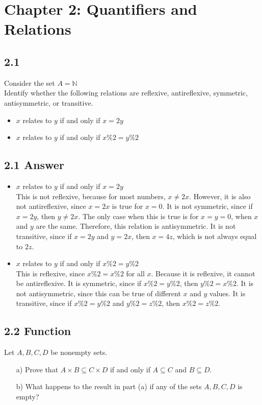 \documentclass{article}
\begin{document}
\section*{Chapter 2: Quantifiers and Relations}
\subsection*{2.1}
Consider the set $A=\mathbb{N}$
\\ Identify whether the following relations are reflexive, antireflexive, symmetric, antisymmetric, or transitive.
\begin{itemize}
    \item $x$ relates to $y$ if and only if $x=2y$ 
    \item $x$ relates to $y$ if and only if $x\%2=y\%2$
\end{itemize}
\newpage
\subsection*{2.1 Answer}
\begin{itemize}
    \item $x$ relates to $y$ if and only if $x=2y$
    \\ This is not reflexive, because for most numbers, $x\neq 2x$. However, it is also not antireflexive, since $x=2x$ is true for $x=0$. It is not symmetric, since if $x=2y$, then $y\neq2x$. The only case when this is true is for $x=y=0$, when $x$ and $y$ are the same. Therefore, this relation is antisymmetric. It is not transitive, since if $x=2y$ and $y=2x$, then $x=4z$, which is not always equal to $2z$.
    \item $x$ relates to $y$ if and only if $x\%2=y\%2$
    \\ This is reflexive, since $x\%2=x\%2$ for all $x$. Because it is reflexive, it cannot be antireflexive. It is symmetric, since if $x\%2=y\%2$, then   $y\%2=x\%2$. It is not antisymmetric, since this can be true of different $x$ and $y$ values. It is transitive, since if $x\%2=y\%2$ and $y\%2=z\%2$, then $x\%2=z\%2$.
\end{itemize}
\newpage
\subsection*{2.2 Function}
Let \( A, B, C, D \) be nonempty sets.
\begin{enumerate}
    \item[a)] Prove that \( A \times B \subseteq C \times D \) if and only if \( A \subseteq C \) and \( B \subseteq D \).
    \item[b)] What happens to the result in part (a) if any of the sets \( A, B, C, D \) is empty?
\end{enumerate}
\newpage
\end{document}
